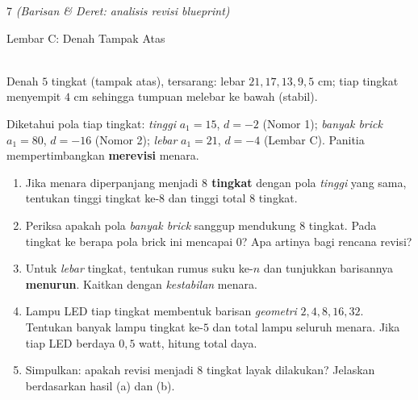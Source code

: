 \documentclass[11pt]{article}
\newenvironment{subsoal}{%
  \begin{enumerate}[label=\textbf{(\alph*)},leftmargin=1.8em,itemsep=5pt,topsep=3pt]}%
  {\end{enumerate}}
\begin{document}
\begin{soal}{7 \normalfont\itshape(Barisan \& Deret: analisis revisi blueprint)}
\begin{lembar}{Lembar C: Denah Tampak Atas}
\centering
{}\\[2pt]
{\small Denah $5$ tingkat (tampak atas), tersarang: lebar $21,17,13,9,5$ cm;
tiap tingkat menyempit $4$ cm sehingga tumpuan melebar ke bawah (stabil).}
\end{lembar}

\smallskip
Diketahui pola tiap tingkat: \emph{tinggi} $a_1=15$, $d=-2$ (Nomor 1);
\emph{banyak brick} $a_1=80$, $d=-16$ (Nomor 2); \emph{lebar} $a_1=21$, $d=-4$
(Lembar C). Panitia mempertimbangkan \textbf{merevisi} menara.

\begin{subsoal}
  \item Jika menara diperpanjang menjadi \textbf{$8$ tingkat} dengan pola
        \emph{tinggi} yang sama, tentukan tinggi tingkat ke-$8$ dan tinggi total
        $8$ tingkat.
  \item Periksa apakah pola \emph{banyak brick} sanggup mendukung $8$ tingkat.
        Pada tingkat ke berapa pola brick ini mencapai $0$? Apa artinya bagi
        rencana revisi?
  \item Untuk \emph{lebar} tingkat, tentukan rumus suku ke-$n$ dan tunjukkan
        barisannya \textbf{menurun}. Kaitkan dengan \emph{kestabilan} menara.
  \item Lampu LED tiap tingkat membentuk barisan \emph{geometri} $2,4,8,16,32$.
        Tentukan banyak lampu tingkat ke-$5$ dan total lampu seluruh menara. Jika
        tiap LED berdaya $0{,}5$ watt, hitung total daya.
  \item Simpulkan: apakah revisi menjadi $8$ tingkat layak dilakukan? Jelaskan
        berdasarkan hasil (a) dan (b).
\end{subsoal}
\end{soal}
\end{document}
